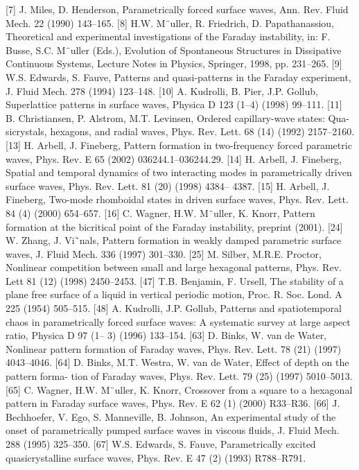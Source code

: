 [7] J. Miles, D. Henderson, Parametrically forced surface waves, Ann. Rev. Fluid Mech. 22 (1990) 143–165.
[8] H.W. M¨uller, R. Friedrich, D. Papathanassiou, Theoretical and experimental investigations of the Faraday instability, in: F. Busse, S.C. M¨uller (Eds.), Evolution of Spontaneous Structures in Dissipative Continuous Systems, Lecture Notes in Physics, Springer, 1998, pp. 231–265.
[9] W.S. Edwards, S. Fauve, Patterns and quasi-patterns in the Faraday experiment, J. Fluid Mech. 278 (1994) 123–148.
[10] A. Kudrolli, B. Pier, J.P. Gollub, Superlattice patterns in surface waves, Physica D 123 (1–4) (1998) 99–111.
[11] B. Christiansen, P. Alstrom, M.T. Levinsen, Ordered capillary-wave states: Qua- sicrystals, hexagons, and radial waves, Phys. Rev. Lett. 68 (14) (1992) 2157–2160.
[13] H. Arbell, J. Fineberg, Pattern formation in two-frequency forced parametric waves, Phys. Rev. E 65 (2002) 036244.1–036244.29.
[14] H. Arbell, J. Fineberg, Spatial and temporal dynamics of two interacting modes in parametrically driven surface waves, Phys. Rev. Lett. 81 (20) (1998) 4384– 4387.
[15] H. Arbell, J. Fineberg, Two-mode rhomboidal states in driven surface waves, Phys. Rev. Lett. 84 (4) (2000) 654–657.
[16] C. Wagner, H.W. M¨uller, K. Knorr, Pattern formation at the bicritical point of the Faraday instability, preprint (2001).
[24] W. Zhang, J. Vi˜nals, Pattern formation in weakly damped parametric surface waves, J. Fluid Mech. 336 (1997) 301–330.
[25] M. Silber, M.R.E. Proctor, Nonlinear competition between small and large hexagonal patterns, Phys. Rev. Lett 81 (12) (1998) 2450–2453.
[47] T.B. Benjamin, F. Ursell, The stability of a plane free surface of a liquid in vertical periodic motion, Proc. R. Soc. Lond. A 225 (1954) 505–515.
[48] A. Kudrolli, J.P. Gollub, Patterns and spatiotemporal chaos in parametrically forced surface waves: A systematic survey at large aspect ratio, Physica D 97 (1– 3) (1996) 133–154.
[63] D. Binks, W. van de Water, Nonlinear pattern formation of Faraday waves, Phys. Rev. Lett. 78 (21) (1997) 4043–4046.
[64] D. Binks, M.T. Westra, W. van de Water, Effect of depth on the pattern forma- tion of Faraday waves, Phys. Rev. Lett. 79 (25) (1997) 5010–5013.
[65] C. Wagner, H.W. M¨uller, K. Knorr, Crossover from a square to a hexagonal pattern in Faraday surface waves, Phys. Rev. E 62 (1) (2000) R33–R36.
[66] J. Bechhoefer, V. Ego, S. Manneville, B. Johnson, An experimental study of the onset of parametrically pumped surface waves in viscous fluids, J. Fluid Mech. 288 (1995) 325–350.
[67] W.S. Edwards, S. Fauve, Parametrically excited quasicrystalline surface waves, Phys. Rev. E 47 (2) (1993) R788–R791.
